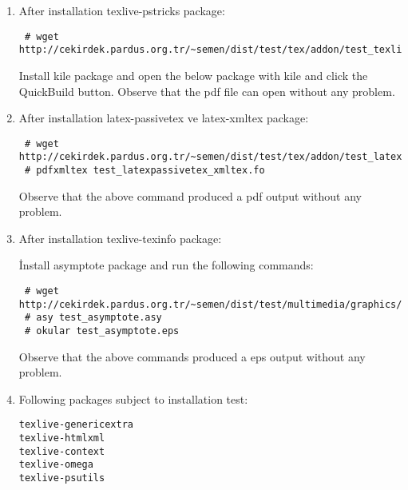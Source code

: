 \documentclass[a4paper,10pt]{article}
\begin{document}
\begin{enumerate}
\item After installation texlive-pstricks package:
\begin{verbatim}
 # wget http://cekirdek.pardus.org.tr/~semen/dist/test/tex/addon/test_texlivepstricks.tex
\end{verbatim}

Install kile package and open the below package with kile and click the QuickBuild button. Observe that the pdf file can open without any problem.
\item  After installation latex-passivetex ve latex-xmltex package:
\begin{verbatim}
 # wget http://cekirdek.pardus.org.tr/~semen/dist/test/tex/addon/test_latexpassivetex_xmltex.fo
 # pdfxmltex test_latexpassivetex_xmltex.fo
\end{verbatim}

Observe that the above command produced a pdf output without any problem.

\item After installation texlive-texinfo package:

İnstall asymptote package and run the following commands:
\begin{verbatim}
 # wget http://cekirdek.pardus.org.tr/~semen/dist/test/multimedia/graphics/test_asymptote.asy
 # asy test_asymptote.asy
 # okular test_asymptote.eps
\end{verbatim}

Observe that the above commands produced a eps output without any problem.

\item Following packages subject to installation test:

\begin{verbatim}
texlive-genericextra
texlive-htmlxml
texlive-context
texlive-omega
texlive-psutils
 
\end{verbatim}

\end{enumerate}
\end{document}
